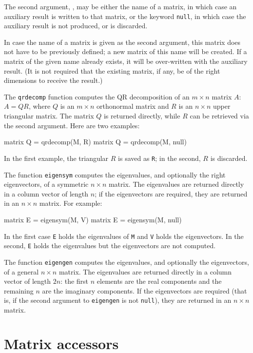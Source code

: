 The second argument, , may be either the name of a matrix, in
which case an auxiliary result is written to that matrix, or the
keyword \texttt{null}, in which case the auxiliary result is not
produced, or is discarded.

In case the name of a matrix is given as the second argument, this
matrix does not have to be previously defined; a new matrix of this
name will be created.  If a matrix of the given name already exists,
it will be over-written with the auxiliary result.  (It is not
required that the existing matrix, if any, be of the right dimensions
to receive the result.)

The \texttt{qrdecomp} function computes the QR decomposition of an $m
\times n$ matrix $A$: $A = QR$, where $Q$ is an $m \times n$
orthonormal matrix and $R$ is an $n \times n$ upper triangular matrix.
The matrix $Q$ is returned directly, while $R$ can be retrieved via
the second argument.  Here are two examples:
%
\begin{code}
matrix Q = qrdecomp(M, R)
matrix Q = qrdecomp(M, null)
\end{code}
%
In the first example, the triangular $R$ is saved as \texttt{R}; in
the second, $R$ is discarded.

The function \texttt{eigensym} computes the eigenvalues, and
optionally the right eigenvectors, of a symmetric $n \times n$ matrix.
The eigenvalues are returned directly in a column vector of length
$n$; if the eigenvectors are required, they are returned in an $n
\times n$ matrix.  For example:
%
\begin{code}
matrix E = eigensym(M, V)
matrix E = eigensym(M, null)
\end{code}
%
In the first case \texttt{E} holds the eigenvalues of \texttt{M} and
\texttt{V} holds the eigenvectors.  In the second, \texttt{E} holds
the eigenvalues but the eigenvectors are not computed.

The function \texttt{eigengen} computes the eigenvalues, and
optionally the eigenvectors, of a general $n \times n$ matrix.  The
eigenvalues are returned directly in a column vector of length $2n$:
the first $n$ elements are the real components and the remaining $n$
are the imaginary components.  If the eigenvectors are required (that
is, if the second argument to \texttt{eigengen} is not \texttt{null}),
they are returned in an $n \times n$ matrix.

\section{Matrix accessors}
\label{matrix-accessors}

